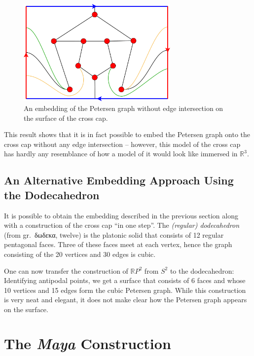 \documentclass[11pt,            %
               a4paper,         %
               oneside,         %
               DIV12,           %
               fleqn,           %
               halfparskip,     %
               nochapterprefix, %
              ]{scrartcl} %
\theoremstyle{definition}
\begin{document}
\begin{figure}[h]
  \centering
  \includegraphics[keepaspectratio=true,width=0.7\textwidth]{../planar-graphs/crosscap-embedding-5.pdf}
  \caption{An embedding of the Petersen graph without edge
    intersection on the surface of the cross cap.}
  \label{fig:rp2embedding}
\end{figure}

This result shows that it is in fact possible to embed the Petersen
graph onto the cross cap without any edge intersection -- however,
this model of the cross cap has hardly any resemblance of how a model
of it would look like immersed in $\mathbb{R}^3$.


\subsection{An Alternative Embedding Approach Using the Dodecahedron}
\label{sec:dodecahedron}

It is possible to obtain the embedding described in the previous
section along with a construction of the cross cap “in one step”. The
\emph{(regular) dodecahedron} (from gr.~\textgreek{δωδεκα}, twelve) is
the platonic solid that consists of 12 regular pentagonal faces. Three
of these faces meet at each vertex, hence the graph consisting of the
20 vertices and 30 edges is cubic.

One can now transfer the construction of $\mathbb{R}P^2$ from $S^2$ to
the dodecahedron: Identifying antipodal points, we get a surface that
consists of 6 faces and whose 10 vertices and 15 edges form the cubic
Petersen graph. While this construction is very neat and elegant, it
does not make clear how the Petersen graph appears on the surface.

\section{The \emph{Maya} Construction}
\end{document}
